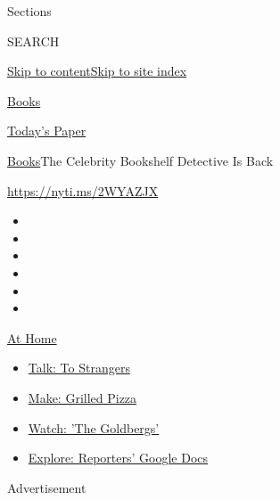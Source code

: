 Sections

SEARCH

\protect\hyperlink{site-content}{Skip to
content}\protect\hyperlink{site-index}{Skip to site index}

\href{https://www.nytimes.com/section/books}{Books}

\href{https://myaccount.nytimes.com/auth/login?response_type=cookie\&client_id=vi}{}

\href{https://www.nytimes.com/section/todayspaper}{Today's Paper}

\href{/section/books}{Books}\textbar{}The Celebrity Bookshelf Detective
Is Back

\url{https://nyti.ms/2WYAZJX}

\begin{itemize}
\item
\item
\item
\item
\item
\item
\end{itemize}

\href{https://www.nytimes.com/spotlight/at-home?action=click\&pgtype=Article\&state=default\&region=TOP_BANNER\&context=at_home_menu}{At
Home}

\begin{itemize}
\tightlist
\item
  \href{https://www.nytimes.com/2020/08/03/well/family/the-benefits-of-talking-to-strangers.html?action=click\&pgtype=Article\&state=default\&region=TOP_BANNER\&context=at_home_menu}{Talk:
  To Strangers}
\item
  \href{https://www.nytimes.com/2020/08/01/at-home/coronavirus-make-pizza-on-a-grill.html?action=click\&pgtype=Article\&state=default\&region=TOP_BANNER\&context=at_home_menu}{Make:
  Grilled Pizza}
\item
  \href{https://www.nytimes.com/2020/07/31/arts/television/goldbergs-abc-stream.html?action=click\&pgtype=Article\&state=default\&region=TOP_BANNER\&context=at_home_menu}{Watch:
  'The Goldbergs'}
\item
  \href{https://www.nytimes.com/interactive/2020/at-home/even-more-reporters-editors-diaries-lists-recommendations.html?action=click\&pgtype=Article\&state=default\&region=TOP_BANNER\&context=at_home_menu}{Explore:
  Reporters' Google Docs}
\end{itemize}

Advertisement

